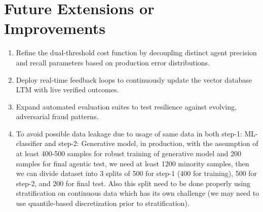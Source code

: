 \documentclass[stu, 12pt, floatsintext]{apa7}
\begin{document}
\section{Future Extensions or Improvements}
\begin{enumerate}[font=\large\color{red}]
	\item Refine the dual-threshold cost function by decoupling distinct agent precision and recall parameters based on production error distributions.
	\item Deploy real-time feedback loops to continuously update the vector database LTM with live verified outcomes.
	\item Expand automated evaluation suites to test resilience against evolving, adversarial fraud patterns.
	\item To avoid possible data leakage due to usage of same data in both step-1: ML-classifier and step-2: Generative model, in production, with the assumption of at least 400-500 samples for robust training of generative model	and 200 samples for final agentic test, we need at least 1200 minority samples, then we can divide dataset into 3 splits of 500 for step-1 (400 for training), 500 for step-2, and 200 for final test. Also this split need to be done properly using stratification on continuous data which has its own challenge (we may need to use quantile-based discretization  prior to stratification).
\end{enumerate}
\end{document}
